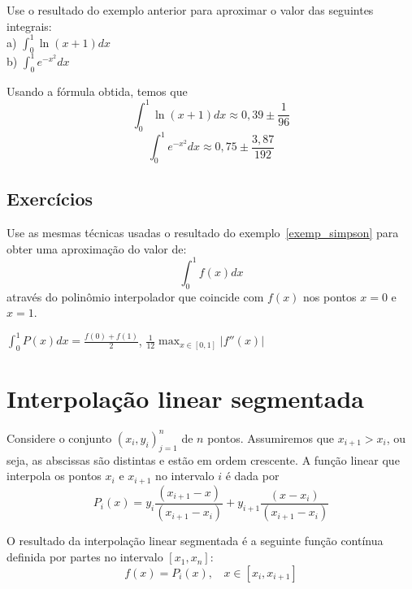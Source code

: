\begin{ex}
Use o resultado do exemplo anterior para aproximar o valor das seguintes integrais:\\

a) $\displaystyle \int_0^1 \ln(x+1) dx$\\

b) $\displaystyle \int_0^1 e^{-x^2}dx$

\end{ex}
\begin{sol}
Usando a fórmula obtida, temos que
$$
\int_0^1\ln(x+1) dx \approx 0,39\pm \frac{1}{96}
$$
$$
\int_0^1 e^{-x^2} dx \approx 0,75\pm \frac{3,87}{192}
$$  
\end{sol}

\subsection*{Exercícios}

\begin{exer}
  Use as mesmas técnicas usadas o resultado do exemplo~\ref{exemp_simpson} para obter uma aproximação do valor de:
  \begin{equation*}
    \int_0^1 f(x)dx
  \end{equation*}
através do polinômio interpolador que coincide com $f(x)$ nos pontos $x=0$ e $x=1$.
\end{exer}
\begin{resp}
  
  $\int_0^1 P(x)dx =\frac{f(0)+f(1)}{2}$, $\frac{1}{12}\max_{x\in[0,1]}|f''(x)|$  
  
\end{resp}

\section{Interpolação linear segmentada}
Considere o conjunto $\left(x_i,y_i\right)_{j=1}^n$ de $n$ pontos. Assumiremos que $x_{i+1}>x_i$, ou seja, as abscissas são distintas e estão em ordem crescente. A função linear que interpola os pontos $x_i$ e $x_{i+1}$ no intervalo $i$ é dada por
$$P_i(x)=y_i \frac{(x_{i+1}-x)}{(x_{i+1}-x_i)} + y_{i+1} \frac{(x-x_i)}{(x_{i+1}-x_i)}$$

O resultado da interpolação linear segmentada é a seguinte função contínua definida por partes no intervalo $[x_1,x_n]$:
$$f(x)=P_i(x), ~~~~ x\in [x_i,x_{i+1}]$$


